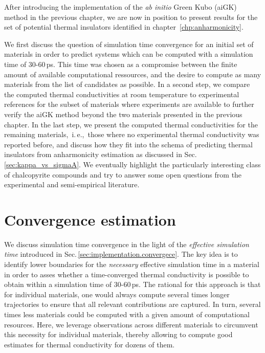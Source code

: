 \label{chp:results}

After introducing the implementation of the \emph{ab initio} Green Kubo (aiGK) method in the previous chapter, we are now in position to present results for the set of potential thermal insulators identified in chapter~\ref{chp:anharmonicity}.

We first discuss the question of simulation time convergence for an initial set of materials in order to predict systems which can be computed with a simulation time of 30-60\,ps. This time was chosen as a compromise between the finite amount of available computational ressources, and the desire to compute as many materials from the list of candidates as possible.
%
In a second step, we compare the computed thermal conductivities at room temperature to experimental references for the subset of materials where experiments are available to further verify the aiGK method beyond the two materials presented in the previous chapter.
%
In the last step, we present the computed thermal conductivities for the remaining materials,~i.\,e.,~those where no experimental thermal conductivity was reported before, and discuss how they fit into the schema of predicting thermal insulators from anharmonicity estimation as discussed in Sec.\,\ref{sec:kappa_vs_sigmaA}. We eventually highlight the particularly interesting class of chalcopyrite compounds and try to answer some open questions from the experimental and semi-empirical literature.




\section{Convergence estimation}
We discuss simulation time convergence in the light of the \emph{effective simulation time} introduced in Sec.\,\ref{sec:implementation.convergece}. The key idea is to identify lower boundaries for the \emph{necessary} effective simulation time in a material in order to asses whether a time-converged thermal conductivity is possible to obtain within a simulation time of 30-60\,ps. The rational for this approach is that for individual materials, one would always compute several times longer trajectories to ensure that all relevant contributions are captured. In turn, several times less materials could be computed with a given amount of computational resources. Here, we leverage observations across different materials to circumvent this necessity for individual materials, thereby allowing to compute good estimates for thermal conductivity for dozens of them.

